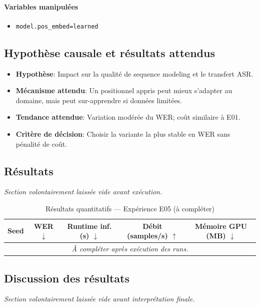 \documentclass[11pt,a4paper]{article}
\begin{document}
\paragraph{Variables manipulées}
\begin{itemize}
\item \texttt{model.pos\_embed=learned}
\end{itemize}

\subsection{Hypothèse causale et résultats attendus}
\begin{itemize}[leftmargin=1.2cm]
\item \textbf{Hypothèse}: Impact sur la qualité de sequence modeling et le transfert ASR.
\item \textbf{Mécanisme attendu}: Un positionnel appris peut mieux s'adapter au domaine, mais peut sur-apprendre si données limitées.
\item \textbf{Tendance attendue}: Variation modérée du WER; coût similaire à E01.
\item \textbf{Critère de décision}: Choisir la variante la plus stable en WER sans pénalité de coût.
\end{itemize}

\subsection{Résultats}
\textit{Section volontairement laissée vide avant exécution.}

\begin{table}[H]
\centering
\caption{Résultats quantitatifs --- Expérience E05 (à compléter)}
\begin{tabular}{lcccc}
\toprule
Seed & WER $\downarrow$ & Runtime inf. (s) $\downarrow$ & Débit (samples/s) $\uparrow$ & Mémoire GPU (MB) $\downarrow$ \\
\midrule
\multicolumn{5}{c}{\textit{À compléter après exécution des runs.}} \\
\bottomrule
\end{tabular}
\end{table}

\subsection{Discussion des résultats}
\textit{Section volontairement laissée vide avant interprétation finale.}
\end{document}
